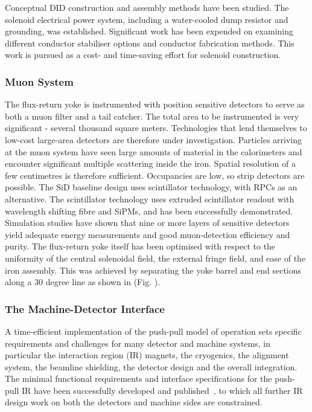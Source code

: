 Conceptual DID construction and
assembly methods have been studied. The solenoid electrical power system,
including a water-cooled dump resistor and grounding, was established.
Significant work has been expended on examining different conductor stabiliser
options and conductor fabrication methods. This work is pursued as a cost- and
time-saving effort for solenoid construction.

\subsubsection{Muon System}
The flux-return yoke is instrumented with position sensitive detectors to
serve as both a muon filter and a tail catcher. The total area to be
instrumented is very significant - several thousand square meters. Technologies
that lend themselves to low-cost large-area detectors are therefore under
investigation. Particles arriving at the muon system have seen large amounts of
material in the calorimeters and encounter significant multiple scattering
inside the iron. Spatial resolution of a few centimetres is therefore
sufficient. Occupancies are low, so strip detectors are possible. The SiD 
baseline design uses scintillator technology, with RPCs as an alternative. 
The scintillator technology uses extruded scintillator readout with wavelength 
shifting fibre and SiPMs, and has been successfully demonstrated. 
Simulation studies have shown that nine or more layers of sensitive detectors 
yield adequate energy measurements and good muon-detection efficiency and purity.
The flux-return yoke itself has been optimised with respect to the uniformity of the central solenoidal field, the external fringe field, and ease of the iron assembly. This was achieved by separating the yoke barrel and end sections along a 30 degree line as shown in (Fig. ).

\subsubsection{The Machine-Detector Interface}
A time-efficient implementation of the push-pull model of
operation sets specific requirements and challenges for many detector and
machine systems, in particular the interaction region (IR) magnets, the
cryogenics, the alignment system, the beamline shielding, the detector design
and the overall integration. The minimal functional requirements and interface
specifications for the push-pull IR have been successfully developed and
published~\cite{Platform_Agreement,IR_Layout}, to which all further IR design
work on both the detectors and machine sides are constrained.

